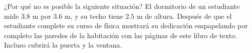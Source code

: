 \item ¿Por qué no es posible la siguiente situación? El dormitorio de un estudiante mide $3.8 \text{ m}$ por $3.6 \text{ m}$, y su techo tiene $2.5 \text{ m}$ de altura. Después de que el estudiante complete su curso de física mostrará su dedicación empapelando por completo las paredes de la habitación con las páginas de este libro de texto. Incluso cubrirá la puerta y la ventana.
